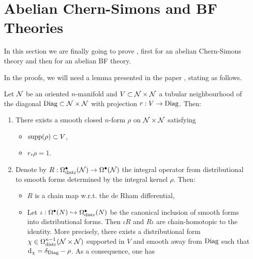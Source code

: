 \section{Abelian Chern-Simons and BF Theories}
\label{sec:abelain_chern_simons_BF_theories}

In this section we are finally going to prove , first for an abelian Chern-Simons theory and then for an abelian BF theory.

In the proofs, we will need a lemma presented in the paper \cite{Gluing_BV-BFV}, stating as follows.

\begin{lemma}
\label{lemma:tubular_neighbourhood}
    Let $\mathcal{N}$ be an oriented $n$-manifold and $V \subset \mathcal{N} \times \mathcal{N}$ a tubular neighbourhood of the diagonal $\text{\normalfont Diag} \subset \mathcal{N} \times \mathcal{N}$ with projection $r: V \rightarrow \text{\normalfont Diag}$.
    Then:
    \begin{enumerate}[label={\normalfont \alph*)}]
        \item \label{enum:tubular_a} There exists a smooth closed $n$-form $\rho$ on $\mathcal{N} \times \mathcal{N}$ satisfying
        \begin{itemize}[label= $\diamond$]
            \item $\text{\normalfont supp}(\rho) \subset V$,
            \item $r_* \rho = 1$.
        \end{itemize}
        \item \label{enum:tubular_b} Denote by $R: \Omega^\bullet_{\text{\normalfont distr}} (\mathcal{N}) \rightarrow \Omega^\bullet (\mathcal{N})$ the integral operator from distributional to smooth forms determined by the integral kernel $\rho$.
        Then:
        \begin{itemize}[label= $\diamond$]
            \item $R$ is a chain map w.r.t. the de Rham differential,
            \item Let $\iota: \Omega^\bullet (N) \hookrightarrow \Omega^\bullet_{\text{\normalfont distr}} (N)$ be the canonical inclusion of smooth forms into distributional forms.
            Then $\iota R$ and $R \iota$ are chain-homotopic to the identity.
            More precisely, there exists a distributional form $\chi \in \Omega_{\text{\normalfont distr}}^{n-1} (\mathcal{N} \times \mathcal{N})$ supported in $V$ and smooth away from $\text{\normalfont Diag}$ such that $\dd_\chi = \delta_{\text{\normalfont Diag}} - \rho$.
            As a consequence, one has
            \begin{equation}
            \label{eq:chain_homotopy_lemma}
                \begin{aligned}

\end{aligned}
\end{equation}
\end{itemize}
\end{enumerate}
\end{lemma}
